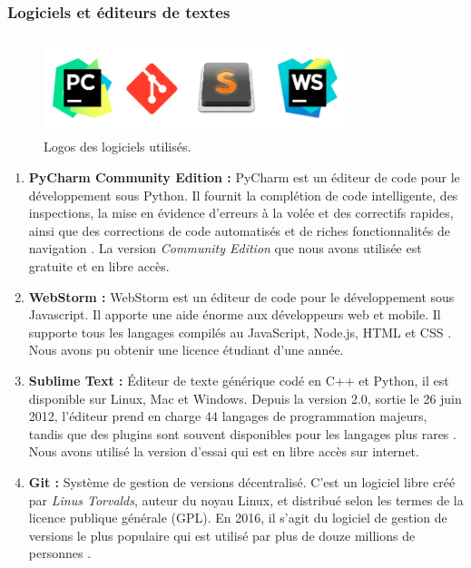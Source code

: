         \subsubsection{Logiciels et éditeurs de textes}
            \begin{figure}[H]
                    \centering
                    \includegraphics[height=80pt,width=250pt]{img/chapter4/tools/software.png}
                    \caption{Logos des logiciels utilisés.}
                    \label{}
            \end{figure}
            \begin{enumerate}[leftmargin=*]
                \item{\textbf{PyCharm Community Edition : }}
                PyCharm est un éditeur de code pour le développement sous Python. Il fournit la complétion de code intelligente, des inspections, la mise en évidence d'erreurs à la volée et des correctifs rapides, ainsi que des corrections de code automatisés et de riches fonctionnalités de navigation \cite{pycharm}. La version \emph{Community Edition} que nous avons utilisée est gratuite et en libre accès.\\

                \item{\textbf{WebStorm : }}
                WebStorm est un éditeur de code pour le développement sous Javascript. Il apporte une aide énorme aux développeurs web et mobile. Il supporte tous les langages compilés au JavaScript, Node.js, HTML et CSS \cite{webstorm}. Nous avons pu obtenir une licence étudiant d'une année.\\

                \item{\textbf{Sublime Text : }}
                Éditeur de texte générique codé en C++ et Python, il est disponible sur Linux, Mac et Windows. Depuis la version 2.0, sortie le 26 juin 2012, l'éditeur prend en charge 44 langages de programmation majeurs, tandis que des plugins sont souvent disponibles pour les langages plus rares \cite{sublime}. Nous avons utilisé la version d’essai qui est en libre accès sur internet.\\

                \item{\textbf{Git : }}
                Système de gestion de versions décentralisé. C'est un logiciel libre créé par \emph{Linus Torvalds}, auteur du noyau Linux, et distribué selon les termes de la licence publique générale (GPL). En 2016, il s’agit du logiciel de gestion de versions le plus populaire qui est utilisé par plus de douze millions de personnes \cite{git}.
            \end{enumerate}

